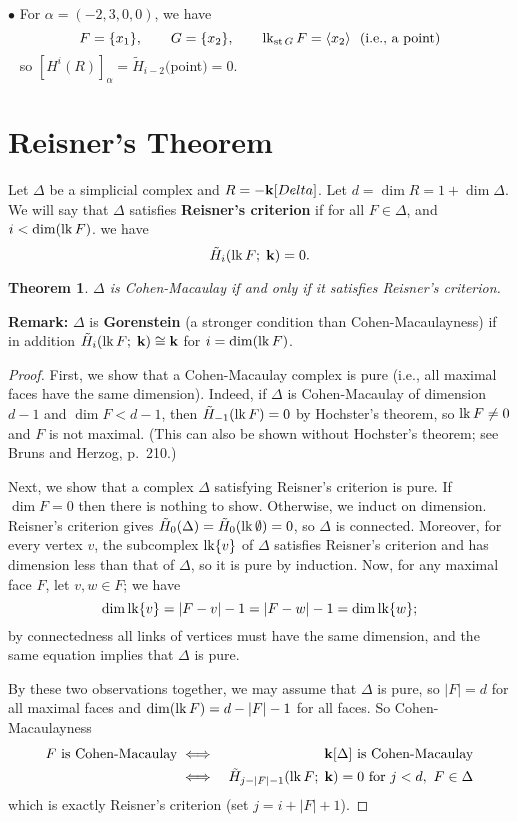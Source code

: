 \documentclass{amsart}
\newtheorem{thm}{Theorem}
\renewcommand{\star}{\mathop{\rm st}\nolimits}
\newcommand{\link}{\mathop{\rm 
lk}\nolimits}
\newcommand{\0}{\emptyset}
\newcommand{\fld}{{\bf k}}
\newcommand{\isom}{\cong}
\newcommand{\defterm}[1] {{\bf #1}}
\begin{document}
$\bullet$ \quad For $\alpha=(-2,3,0,0)$, we have
	$$F = \{x_1\}, \qquad G = \{x_2\}, \qquad \link_{\star G} F = 
	\langle x_2 \rangle ~~ \text{(i.e., a point)}$$
\quad~ so $\left[ H^i(R) \right]_\alpha = \tilde H_{i-2}($point$) = 0$.

\section{Reisner's Theorem}

Let $\Delta$ be a simplicial complex and $R=-\fld[Delta]$.  Let $d = \dim R = 1+\dim \Delta$.
We will say that $\Delta$ satisfies \defterm{Reisner's criterion} if for all $F \in \Delta$,
and $i<\dim(\link F)$. we have
	$$\tilde H_i(\link F;\;\fld)=0.$$

\begin{thm}
$\Delta$ is Cohen-Macaulay if and only if it satisfies Reisner's criterion.
\end{thm}

{\bf Remark:} $\Delta$ is \defterm{Gorenstein} (a stronger condition than Cohen-Macaulayness)  
if in addition $\tilde H_i(\link F;\;\fld) \isom \fld$ for $i=\dim(\link F)$.

\begin{proof} First, we show that a Cohen-Macaulay complex is pure (i.e., all maximal faces
have the same dimension).  Indeed, if $\Delta$ is Cohen-Macaulay of dimension $d-1$ and $\dim
F < d-1$, then $\tilde H_{-1}(\link F)=0$ by Hochster's theorem, so $\link F \neq 0$ and $F$
is not maximal.  (This can also be shown without Hochster's theorem; see Bruns and Herzog,
p.~210.)

Next, we show that a complex $\Delta$ satisfying Reisner's criterion is pure.  If $\dim F = 0$
then there is nothing to show.  Otherwise, we induct on dimension.  Reisner's criterion gives
$\tilde H_0(\Delta) = \tilde H_0(\link \emptyset) = 0$, so $\Delta$ is connected. Moreover,
for every vertex $v$, the subcomplex $\link\{v\}$ of $\Delta$ satisfies Reisner's criterion
and has dimension less than that of $\Delta$, so it is pure by induction.  Now, for any
maximal face $F$, let $v,w \in F$; we have
	$$\dim \link\{v\} = |F-v|-1 = |F-w|-1 = \dim \link\{w\};$$
by connectedness all links of vertices must have the same dimension, and the same equation 
implies that $\Delta$ is pure.

By these two observations together, we may assume that $\Delta$ is pure, so $|F|=d$ for all 
maximal faces and $\dim(\link F)=d-|F|-1$ for all faces.  So Cohen-Macaulayness
	\begin{eqnarray*}
	F~\text{is Cohen-Macaulay} &\iff& \fld[\Delta]~\text{is Cohen-Macaulay} \\
	&\iff& \tilde H_{j-|F|-1}(\link F;\;\fld)=0 ~\text{for}~ j<d, ~ F \in \Delta \\
	\end{eqnarray*}
which is exactly Reisner's criterion (set $j = i+|F|+1$).
\end{proof}
\end{document}
